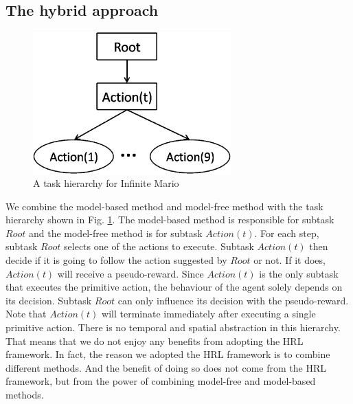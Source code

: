 \subsection{The hybrid approach}
\begin{figure}[ht]
    \begin{center}
    \includegraphics[width=3.0in] {./figures/MarioHierarchy.eps}
    \end{center}

\caption{A task hierarchy for Infinite Mario}
\label{fig:MarioHierarchy}
\end{figure}
We combine the model-based method and model-free method with the task hierarchy shown in Fig. \ref{fig:MarioHierarchy}.
The model-based method is responsible for subtask $Root$ and the model-free method is for
subtask $Action(t)$.
For each step, subtask $Root$ selects one of the actions to execute.
Subtask $Action(t)$ then decide if it is going to follow the action suggested by $Root$ or not. 
If it does, $Action(t)$ will receive a pseudo-reward. 
Since $Action(t)$ is the only subtask that executes the primitive action,
the behaviour of the agent solely depends on its decision.
Subtask $Root$ can only influence its decision with the pseudo-reward.
Note that $Action(t)$ will terminate immediately after executing a single primitive action.
There is no temporal and spatial abstraction in this hierarchy.
That means that we do not enjoy any benefits from adopting the HRL framework.
In fact, the reason we adopted the HRL framework is to combine different methods.
And the benefit of doing so does not come from the HRL framework, but from the power of combining
model-free and model-based methods.

